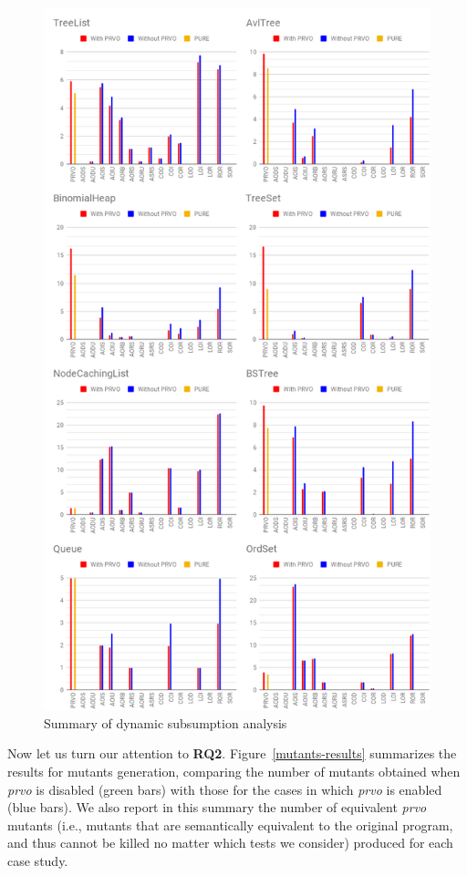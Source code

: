 \begin{figure}[t]
	\begin{center}
		\includegraphics[width=12cm]{figures/Tables.png}
	\end{center}
	\caption{Summary of dynamic subsumption analysis}
	\label{subsumption-results}
\end{figure}

Now let us turn our attention to \textbf{RQ2}. Figure~\ref{mutants-results} summarizes the results for mutants generation, comparing the number of mutants obtained when \emph{prvo} is disabled (green bars) with those for the cases in which \emph{prvo} is enabled (blue bars). We also report in this summary the number of equivalent \emph{prvo} mutants (i.e., mutants that are semantically equivalent to the original program, and thus cannot be killed no matter which tests we consider) produced for each case study.

